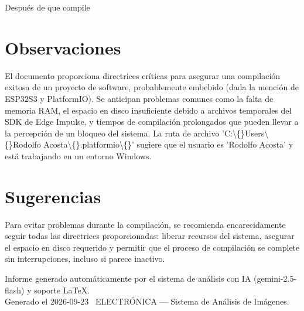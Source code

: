 \documentclass[11pt,a4paper]{article}
\begin{document}
Después de que compile

\section*{Observaciones}
El documento proporciona directrices críticas para asegurar una compilación exitosa de un proyecto de software, probablemente embebido (dada la mención de ESP32S3 y PlatformIO). Se anticipan problemas comunes como la falta de memoria RAM, el espacio en disco insuficiente debido a archivos temporales del SDK de Edge Impulse, y tiempos de compilación prolongados que pueden llevar a la percepción de un bloqueo del sistema. La ruta de archivo 'C:\textbackslash\{\}Users\textbackslash\{\}Rodolfo Acosta\textbackslash\{\}.platformio\textbackslash\{\}' sugiere que el usuario es 'Rodolfo Acosta' y está trabajando en un entorno Windows.

\section*{Sugerencias}
Para evitar problemas durante la compilación, se recomienda encarecidamente seguir todas las directrices proporcionadas: liberar recursos del sistema, asegurar el espacio en disco requerido y permitir que el proceso de compilación se complete sin interrupciones, incluso si parece inactivo.

\vspace{12pt}
\begin{center}
  \footnotesize\color{gray}
  Informe generado automáticamente por el sistema de análisis con IA (gemini-2.5-flash) y soporte LaTeX. \\
  Generado el 2026-09-23 \textbullet\ ELECTRÓNICA --- Sistema de Análisis de Imágenes.
\end{center}
\end{document}
